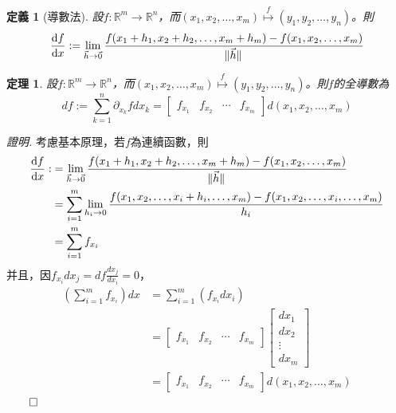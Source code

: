 \documentclass[12pt]{article}
\newtheorem{definition}{定義}
\newtheorem*{theorem}{定理}
\renewenvironment*{proof}{\textit{證明.}}{\hfill$\qed$}
\begin{document}
    \begin{definition}[導數法]
        設$f:\mathbb{R}^m\to\mathbb{R}^n$，而$(x_1,x_2,\dots,x_m)\overset{f}{\mapsto}(y_1,y_2,\dots,y_n)$。則\begin{align*}
            \derivative{f}{x}:=\lim_{\vec{h}\to\vec{0}}\frac{f(x_1+h_1,x_2+h_2,\dots,x_m+h_m)-f(x_1,x_2,\dots,x_m)}{\norm*{\vec{h}}}
        \end{align*}
    \end{definition}

    \begin{theorem}
        設$f:\mathbb{R}^m\to\mathbb{R}^n$，而$(x_1,x_2,\dots,x_m)\overset{f}{\mapsto}(y_1,y_2,\dots,y_n)$。則$f$的全導數為$$df:=\sum_{k=1}^{n}\partial_{x_k}f dx_k=\begin{bmatrix}
            f_{x_1}&f_{x_2}&\cdots&f_{x_m}
        \end{bmatrix}d(x_1,x_2,\dots,x_m)$$
    \end{theorem}

    \begin{proof}
        考慮基本原理，若$f$為連續函數，則\begin{align*}
            \derivative{f}{x}:&=\lim_{\vec{h}\to\vec{0}}\frac{f(x_1+h_1,x_2+h_2,\dots,x_m+h_m)-f(x_1,x_2,\dots,x_m)}{\norm*{\vec{h}}}\\
            &=\sum_{i=1}^{m}\lim_{h_i\to 0}\frac{f(x_1,x_2,\dots,x_i+h_i,\dots,x_m)-f(x_1,x_2,\dots,x_i,\dots,x_m)}{h_i}\\
            &=\sum_{i=1}^{m}f_{x_i}
        \end{align*}
        并且，因$f_{x_i} dx_j=df\frac{dx_j}{dx_i}=0$，\begin{align*}
            (\sum_{i=1}^{m}f_{x_i})dx&=\sum_{i=1}^{m}(f_{x_i} dx_i)\\
            &=\begin{bmatrix}
                f_{x_1}&f_{x_2}&\cdots&f_{x_m}
            \end{bmatrix}\begin{bmatrix}
                dx_1\\dx_2\\\vdots\\dx_m
            \end{bmatrix}\\
            &=\begin{bmatrix}
                f_{x_1}&f_{x_2}&\cdots&f_{x_m}
            \end{bmatrix}d(x_1,x_2,\dots,x_m)
        \end{align*}
    \end{proof}
\end{document}
